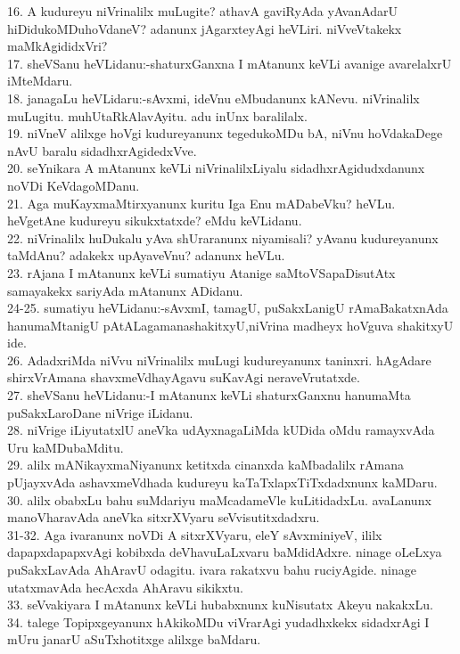 \documentclass{article}
\begin{document}
16. A kudureyu niVrinalilx muLugite? athavA gaviRyAda yAvanAdarU hiDidukoMDuhoVdaneV? adanunx jAgarxteyAgi heVLiri. niVveVtakekx maMkAgididxVri?\\
17. sheVSanu heVLidanu:-shaturxGanxna I mAtanunx keVLi avanige avarelalxrU iMteMdaru.\\
18. janagaLu heVLidaru:-sAvxmi, ideVnu eMbudanunx kANevu. niVrinalilx muLugitu. muhUtaRkAlavAyitu. adu inUnx baralilalx.\\
19. niVneV alilxge hoVgi kudureyanunx tegedukoMDu bA, niVnu hoVdakaDege nAvU baralu sidadhxrAgidedxVve.\\
20. seYnikara A mAtanunx keVLi niVrinalilxLiyalu sidadhxrAgidudxdanunx noVDi KeVdagoMDanu.\\
21. Aga muKayxmaMtirxyanunx kuritu Iga Enu mADabeVku? heVLu. heVgetAne kudureyu sikukxtatxde? eMdu keVLidanu.\\
22. niVrinalilx huDukalu yAva shUraranunx niyamisali? yAvanu kudureyanunx taMdAnu? adakekx upAyaveVnu? adanunx heVLu.\\
23. rAjana I mAtanunx keVLi sumatiyu Atanige saMtoVSapaDisutAtx samayakekx sariyAda mAtanunx ADidanu.\\
24-25. sumatiyu heVLidanu:-sAvxmI, tamagU, puSakxLanigU rAmaBakatxnAda hanumaMtanigU pAtALagamanashakitxyU,niVrina madheyx hoVguva shakitxyU ide.\\
26. AdadxriMda niVvu niVrinalilx muLugi kudureyanunx taninxri. hAgAdare shirxVrAmana shavxmeVdhayAgavu suKavAgi neraveVrutatxde.\\
27. sheVSanu heVLidanu:-I mAtanunx keVLi shaturxGanxnu hanumaMta puSakxLaroDane niVrige iLidanu.\\
28. niVrige iLiyutatxlU aneVka udAyxnagaLiMda kUDida oMdu ramayxvAda Uru kaMDubaMditu.\\
29. alilx mANikayxmaNiyanunx ketitxda cinanxda kaMbadalilx rAmana pUjayxvAda ashavxmeVdhada kudureyu kaTaTxlapxTiTxdadxnunx kaMDaru.\\
30. alilx obabxLu bahu suMdariyu maMcadameVle kuLitidadxLu. avaLanunx manoVharavAda aneVka sitxrXVyaru seVvisutitxdadxru.\\
31-32. Aga ivaranunx noVDi A sitxrXVyaru, eleY sAvxminiyeV, ililx dapapxdapapxvAgi kobibxda deVhavuLaLxvaru baMdidAdxre. ninage oLeLxya puSakxLavAda AhAravU odagitu. ivara rakatxvu bahu ruciyAgide. ninage utatxmavAda hecAcxda AhAravu sikikxtu.\\
33. seVvakiyara I mAtanunx keVLi hubabxnunx kuNisutatx Akeyu nakakxLu.\\
34. talege Topipxgeyanunx hAkikoMDu viVrarAgi yudadhxkekx sidadxrAgi I mUru janarU aSuTxhotitxge alilxge baMdaru.\\
\end{document}
